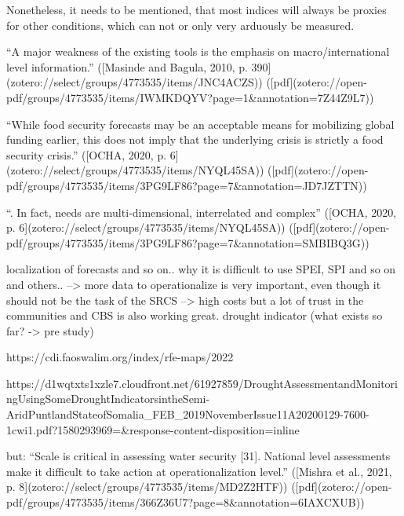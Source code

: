 Nonetheless, it needs to be mentioned, that most indices will always be proxies for other conditions, which can not or only very arduously be measured. 

“A major weakness of the existing tools is the emphasis on macro/international level information.” ([Masinde and Bagula, 2010, p. 390](zotero://select/groups/4773535/items/JNC4ACZS)) ([pdf](zotero://open-pdf/groups/4773535/items/IWMKDQYV?page=1&annotation=7Z44Z9L7))

“While food security forecasts may be an acceptable means for mobilizing global funding earlier, this does not imply that the underlying crisis is strictly a food security crisis.” ([OCHA, 2020, p. 6](zotero://select/groups/4773535/items/NYQL45SA)) ([pdf](zotero://open-pdf/groups/4773535/items/3PG9LF86?page=7&annotation=JD7JZTTN))

“. In fact, needs are multi-dimensional, interrelated and complex” ([OCHA, 2020, p. 6](zotero://select/groups/4773535/items/NYQL45SA)) ([pdf](zotero://open-pdf/groups/4773535/items/3PG9LF86?page=7&annotation=SMBIBQ3G))

localization of forecasts and so on.. why it is difficult to use SPEI, SPI and so on and others.. --> more data to operationalize is very important, even though it should not be the task of the SRCS --> high costs but a lot of trust in the communities and CBS is also working great.
drought indicator (what exists so far? -> pre study)

https://cdi.faoswalim.org/index/rfe-maps/2022

https://d1wqtxts1xzle7.cloudfront.net/61927859/DroughtAssessmentandMonitoringUsingSomeDroughtIndicatorsintheSemi-AridPuntlandStateofSomalia_FEB_2019NovemberIssue11A20200129-7600-1cwi1.pdf?1580293969=&response-content-disposition=inline%

but: 
“Scale is critical in assessing water security [31]. National level assessments make it difficult to take action at operationalization level.” ([Mishra et al., 2021, p. 8](zotero://select/groups/4773535/items/MD2Z2HTF)) ([pdf](zotero://open-pdf/groups/4773535/items/366Z36U7?page=8&annotation=6IAXCXUB))


